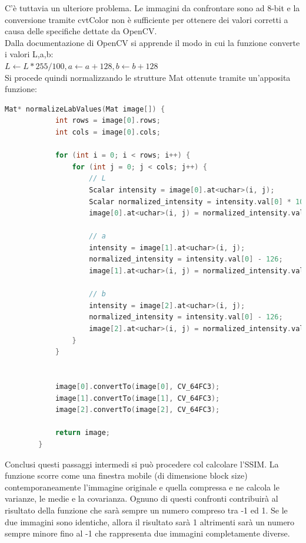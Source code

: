 \documentclass[a4paper,11pt]{article}
\begin{document}
    C'è tuttavia un ulteriore problema. Le immagini da confrontare sono ad 8-bit e la conversione tramite cvtColor non è sufficiente per ottenere dei valori corretti a causa delle specifiche dettate da OpenCV.\\
    Dalla documentazione di OpenCV si apprende il modo in cui la funzione converte i valori L,a,b: \\

    $L \longleftarrow L*255/100, a \longleftarrow a +128, b \longleftarrow b+128 $ \\

    Si procede quindi normalizzando le strutture Mat ottenute tramite un'apposita funzione:
    
    \begin{lstlisting}[language=C++]
        Mat* normalizeLabValues(Mat image[]) {
            int rows = image[0].rows;
            int cols = image[0].cols;
        
            for (int i = 0; i < rows; i++) {
                for (int j = 0; j < cols; j++) {
                    // L
                    Scalar intensity = image[0].at<uchar>(i, j);
                    Scalar normalized_intensity = intensity.val[0] * 100 / 256;
                    image[0].at<uchar>(i, j) = normalized_intensity.val[0];
        
                    // a
                    intensity = image[1].at<uchar>(i, j);
                    normalized_intensity = intensity.val[0] - 126;
                    image[1].at<uchar>(i, j) = normalized_intensity.val[0];
        
                    // b
                    intensity = image[2].at<uchar>(i, j);
                    normalized_intensity = intensity.val[0] - 126;
                    image[2].at<uchar>(i, j) = normalized_intensity.val[0];
                }
            }
        
        
            image[0].convertTo(image[0], CV_64FC3);
            image[1].convertTo(image[1], CV_64FC3);
            image[2].convertTo(image[2], CV_64FC3);
        
            return image;
        }
    \end{lstlisting}  
    
    Conclusi questi passaggi intermedi si può procedere col calcolare l'SSIM.
    La funzione scorre come una finestra mobile (di dimensione block size) contemporaneamente l'immagine originale e quella compressa e ne calcola le varianze, le medie e la covarianza. 
    Ognuno di questi confronti contribuirà al risultato della funzione che sarà sempre un numero compreso tra -1 ed 1.
    Se le due immagini sono identiche, allora il risultato sarà 1 altrimenti sarà un numero sempre minore fino al -1 che rappresenta due immagini completamente diverse.
\end{document}
